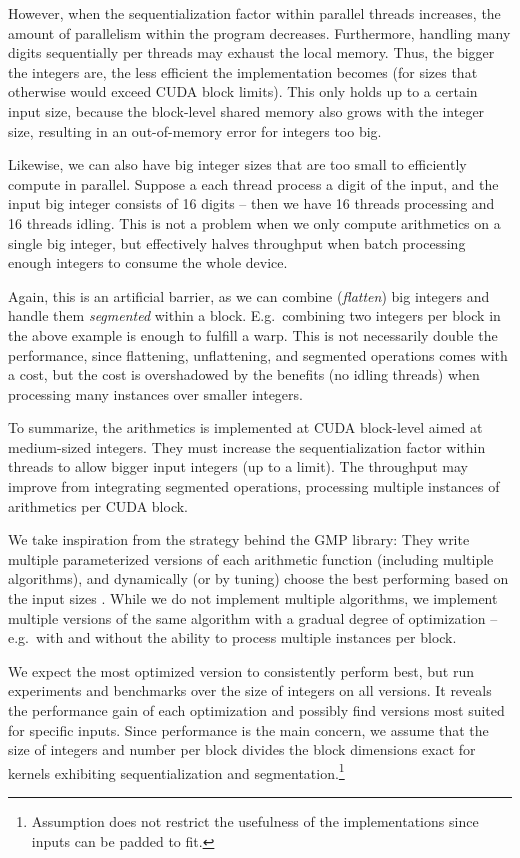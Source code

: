 However, when the sequentialization factor within parallel threads increases,
the amount of parallelism within the program decreases. Furthermore, handling
many digits sequentially per threads may exhaust the local memory. Thus, the
bigger the integers are, the less efficient the implementation becomes (for
sizes that otherwise would exceed CUDA block limits). This only holds up to a
certain input size, because the block-level shared memory also grows with the
integer size, resulting in an out-of-memory error for integers too big.

Likewise, we can also have big integer sizes that are too small to efficiently
compute in parallel. Suppose a each thread process a digit of the input, and the
input big integer consists of 16 digits -- then we have 16 threads processing and
16 threads idling. This is not a problem when we only compute arithmetics on a
single big integer, but effectively halves throughput when batch processing
enough integers to consume the whole device.

Again, this is an artificial barrier, as we can combine (\textit{flatten}) big
integers and handle them \textit{segmented} within a block. E.g.\ combining two
integers per block in the above example is enough to fulfill a warp. This is not
necessarily double the performance, since flattening, unflattening, and
segmented operations comes with a cost, but the cost is overshadowed by the
benefits (no idling threads) when processing many instances over smaller
integers.\newline

To summarize, the arithmetics is implemented at CUDA block-level aimed at
medium-sized integers. They must increase the sequentialization factor within
threads to allow bigger input integers (up to a limit). The throughput may
improve from integrating segmented operations, processing multiple instances of
arithmetics per CUDA block.

We take inspiration from the strategy behind the GMP library: They write
multiple parameterized versions of each arithmetic function (including multiple
algorithms), and dynamically (or by tuning) choose the best performing based on
the input sizes \cite{GMP}. While we do not implement multiple algorithms, we
implement multiple versions of the same algorithm with a gradual degree of
optimization -- e.g.\ with and without the ability to process multiple instances
per block.

We expect the most optimized version to consistently perform best, but run
experiments and benchmarks over the size of integers on all versions. It reveals
the performance gain of each optimization and possibly find versions most suited
for specific inputs. Since performance is the main concern, we assume that the
size of integers and number per block divides the block dimensions exact for
kernels exhibiting sequentialization and segmentation.\footnote{Assumption does
  not restrict the usefulness of the implementations since inputs can be padded
  to fit.}

